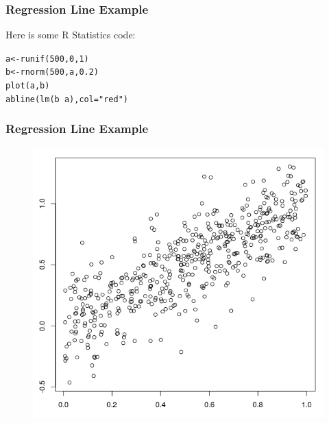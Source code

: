 \documentclass[xcolor=dvipsnames]{beamer}
\begin{document}
\begin{frame}[fragile]
  \frametitle{Regression Line Example}
  Here is some R Statistics code:
\begin{alltt}
a<-runif(500,0,1) \newline
b<-rnorm(500,a,0.2) \newline
plot(a,b) \newline
abline(lm(b~a),col="red")
\end{alltt}
\end{frame}

\begin{frame}
  \frametitle{Regression Line Example}
  \begin{figure}[h]
    \includegraphics[scale=0.4]{./diagrams/abline1.png}
  \end{figure}
\end{frame}
\end{document}
